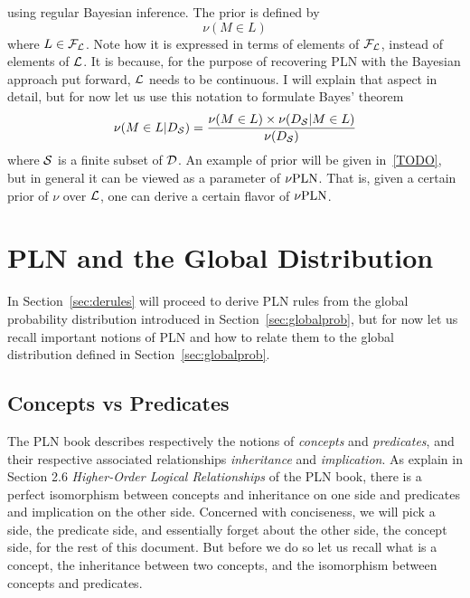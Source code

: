 \documentclass[]{article}
\begin{document}
using regular Bayesian inference.  The prior is defined by
$$\nu(M \in L)$$ where $L \in \mathcal{F}_{\mathcal{L}}$.  Note how it is
expressed in terms of elements of $\mathcal{F}_{\mathcal{L}}$, instead of
elements of $\mathcal{L}$.  It is because, for the purpose of recovering
PLN with the Bayesian approach put forward, $\mathcal{L}$ needs to be
continuous.  I will explain that aspect in detail, but for now let us
use this notation to formulate Bayes' theorem
$$\nu(M \in L | D_{\mathcal{S}}) = \frac{\nu(M \in L) \times \nu(D_{\mathcal{S}} | M \in
  L)}{\nu(D_{\mathcal{S}})}$$ where $\mathcal{S}$ is a finite subset of
$\mathcal{D}$.  An example of prior will be given in~\ref{TODO}, but in
general it can be viewed as a parameter of $\nu\textup{PLN}$.  That is, given a
certain prior of $\nu$ over $\mathcal{L}$, one can derive a certain
flavor of $\nu\textup{PLN}$.

\section{PLN and the Global Distribution}
In Section~\ref{sec:derules} will proceed to derive PLN rules from the
global probability distribution introduced in
Section~\ref{sec:globalprob}, but for now let us recall important
notions of PLN and how to relate them to the global distribution
defined in Section~\ref{sec:globalprob}.

\subsection{Concepts vs Predicates}
The PLN book describes respectively the notions of \emph{concepts} and
\emph{predicates}, and their respective associated relationships
\emph{inheritance} and \emph{implication}.  As explain in Section 2.6
\emph{Higher-Order Logical Relationships} of the PLN book, there is a
perfect isomorphism between concepts and inheritance on one side and
predicates and implication on the other side.  Concerned with
conciseness, we will pick a side, the predicate side, and essentially
forget about the other side, the concept side, for the rest of this
document.  But before we do so let us recall what is a concept, the
inheritance between two concepts, and the isomorphism between concepts
and predicates.
\end{document}
